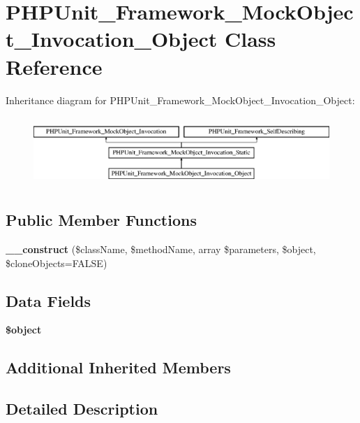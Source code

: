 \section{P\+H\+P\+Unit\+\_\+\+Framework\+\_\+\+Mock\+Object\+\_\+\+Invocation\+\_\+\+Object Class Reference}
\label{class_p_h_p_unit___framework___mock_object___invocation___object}
Inheritance diagram for P\+H\+P\+Unit\+\_\+\+Framework\+\_\+\+Mock\+Object\+\_\+\+Invocation\+\_\+\+Object\+:\begin{figure}[H]
\begin{center}
\leavevmode
\includegraphics[height=2.625000cm]{class_p_h_p_unit___framework___mock_object___invocation___object}
\end{center}
\end{figure}
\subsection*{Public Member Functions}
\begin{DoxyCompactItemize}
\item 
{\bf \+\_\+\+\_\+construct} (\$class\+Name, \$method\+Name, array \$parameters, \$object, \$clone\+Objects=F\+A\+L\+S\+E)
\end{DoxyCompactItemize}
\subsection*{Data Fields}
\begin{DoxyCompactItemize}
\item 
{\bf \$object}
\end{DoxyCompactItemize}
\subsection*{Additional Inherited Members}


\subsection{Detailed Description}


